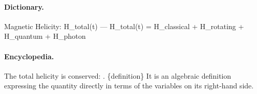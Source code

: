 \paragraph{Dictionary.}
Magnetic Helicity: H\_total(t) — H\_total(t) = H\_classical + H\_rotating + H\_quantum + H\_photon

\paragraph{Encyclopedia.}
The total helicity is conserved: . \{definition\} It is an algebraic definition expressing the quantity directly in terms of the variables on its right-hand side.
